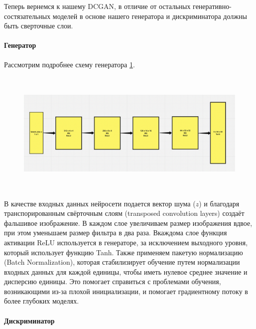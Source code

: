 Теперь вернемся к нашему DCGAN, в отличие от остальных генеративно-состязательных моделей в основе нашего генератора и дискриминатора должны быть сверточные слои.

\paragraph{Генератор}

Рассмотрим подробнее схему генератора {\color{blue} \ref{fig.generator_scheme_DCGAN}}.
\begin{figure}
    \centering
    \includegraphics[height=60mm]{fig/generator_scheme_DCGAN.png}
    \caption{}
    \label{fig.generator_scheme_DCGAN}
\end{figure}
В качестве входных данных нейросети подается вектор шума ($z$) и благодаря транспорированным свёрточным слоям (transposed convolution layers) создаёт фальшивое изображение. В каждом слое увеличиваем размер изображения вдвое, при этом уменьшаем размер фильтра в два раза. Вкаждома слое функция активации ReLU используется в генераторе, за исключением выходного уровня, который использует функцию Tanh.
Также применяем пакетую нормализацию (Batch Normalization), которая стабилизирует обучение путем нормализации входных данных для каждой единицы, чтобы иметь нулевое среднее значение и дисперсию единицы. Это помогает справиться с проблемами обучения, возникающими из-за плохой инициализации, и помогает градиентному потоку в более глубоких моделях.

\paragraph{Дискриминатор}

